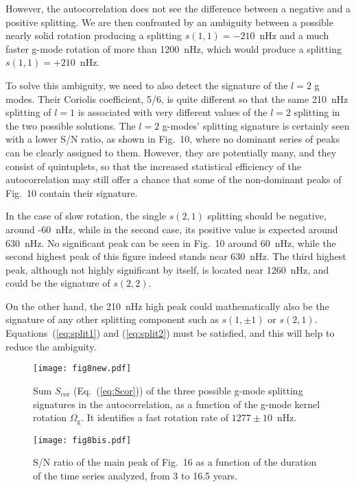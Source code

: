 \documentclass[bibyear]{aa}
\begin{document}
However, the autocorrelation does not see the difference between a negative and a positive splitting. We are then confronted by an ambiguity between a possible nearly solid rotation producing a splitting $s(1,1)=-210$~nHz and  a much faster g-mode rotation of more than 1200~nHz, which would produce a splitting $s(1,1)=+210$~nHz.

To solve this ambiguity, we need to also detect the signature of the $l=2$ g modes. Their Coriolis coefficient, 5/6, is quite different so that the same 210~nHz splitting of $l=1$ is associated with very different values of the $l=2$ splitting in the two possible solutions. The $l=2$ g-modes' splitting signature is certainly seen with a lower S/N ratio, as  shown in Fig.~10, where no dominant series of peaks can be clearly assigned to them.  However, they are potentially many, and they consist of quintuplets, so that the increased statistical efficiency of the autocorrelation may still offer a chance that some of the non-dominant peaks of Fig.~10 contain their signature.

In the case of slow rotation, the single $s(2,1)$ splitting should be negative, around -60~nHz, while in the second case, its positive value is expected around  630~nHz. No significant peak can be seen in Fig.~10 around 60~nHz, while the second highest peak of this figure indeed stands near 630~nHz. The third highest peak, although not highly significant by itself,  is located near 1260~nHz, and could be the signature of $s(2,2)$. 

On the other hand, the 210~nHz high peak could mathematically also be the signature of any other splitting component such as $s(1,\pm 1)$ or $s(2,1)$. Equations~(\ref{eq:split1}) and (\ref{eq:split2}) must be satisfied, and this will help to reduce the ambiguity.

\begin{figure}
\centering
\texttt{[image: fig8new.pdf]}
\caption{Sum $S_\mathrm{cor}$ (Eq.~(\ref{eq:Scor})) of the three possible g-mode splitting signatures in the autocorrelation, as a function of the g-mode kernel rotation $\Omega_\mathrm{g}$. It identifies a fast rotation rate of $1277 \pm 10$~nHz.}
\label{fig:Scor}
\end{figure} 

\begin{figure}
\centering
\texttt{[image: fig8bis.pdf]}
\caption{S/N ratio of the main peak of Fig.~16 as a function of the duration of the time series analyzed, from 3 to 16.5 years.}
\label{fig:SN_Scor}
\end{figure} 
\end{document}
